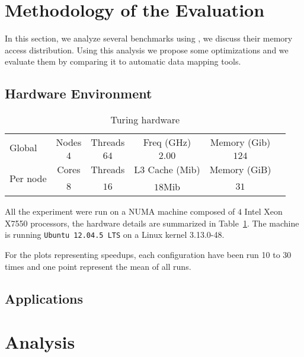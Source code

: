 
\section{Methodology of the Evaluation}
\label{sec:expe}

In this section, we analyze several benchmarks using \TABARNAC, we discuss
their memory access distribution. Using this analysis we propose some
optimizations and we evaluate them by comparing it to automatic data mapping
tools.

\subsection{Hardware Environment}
\label{sec:expe-setup}

\begin{table}
    \centering
        \begin{tabular}{|l|c|c|c|c|c|}
            \hline
            \multirow{2}{*}{Global} & Nodes & Threads & Freq (GHz) & Memory (Gib) \\
            \cline{2-5}
                & $4$   & $64$ & $2.00$ & $124$ \\
            \hline
           \multirow{2}{*}{Per node} & Cores & Threads & L3 Cache (Mib) & Memory (GiB) \\
            \cline{2-5}
            & $8$ & $16$ & $18$Mib & $31$  \\
            \hline
        \end{tabular}
    \caption{Turing hardware}
    \label{tab:turing}
\end{table}

All the experiment were run on a NUMA machine composed of $4$ Intel Xeon X7550
processors, the hardware details are summarized in Table~\ref{tab:turing}.
The machine is running \texttt{Ubuntu 12.04.5 LTS} on a Linux kernel 3.13.0-48.

For the plots representing speedups, each configuration have been run 10 to 30
times and one point represent the mean of all runs.

\subsection{Applications}

\section{Analysis}
\label{sec:expe-analysis}

